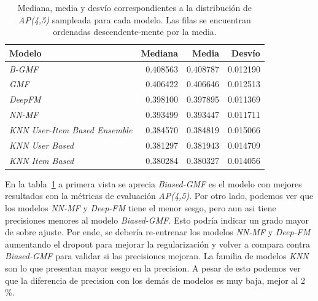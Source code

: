 \documentclass[11pt,a4paper,twoside]{thesis}
\begin{document}
\begin{table}[!htb]
	\centering
	\footnotesize
	\begin{tabular}{lrrr}
		\hline
		Modelo                                & Mediana  & Media    & Desvío   \\
		\hline
		\textit{B-GMF}                        & 0.408563 & 0.408787 & 0.012190 \\
		\textit{GMF}                          & 0.406422 & 0.406646 & 0.012513 \\
		\textit{DeepFM}                       & 0.398100 & 0.397895 & 0.011369 \\
		\textit{NN-MF}                        & 0.393499 & 0.393447 & 0.011711 \\
		\textit{KNN User-Item Based Ensemble} & 0.384570 & 0.384819 & 0.015066 \\
		\textit{KNN User Based}               & 0.381297 & 0.381943 & 0.014709 \\
		\textit{KNN Item Based}               & 0.380284 & 0.380327 & 0.014056 \\
		\hline
	\end{tabular}
	\caption{
		Mediana, media y desvío correspondientes a la distribución de
		\textit{AP(4,5)} sampleada para cada modelo. Las filas se encuentran ordenadas descendente-mente por la media.
	}
	\label{table:ap_at_k}
\end{table}

En la tabla~\ref{table:ap_at_k} a primera vista se aprecia \textit{Biased-GMF}
es el modelo con mejores resultados con la métricas de evaluación
\textit{AP(4,5)}. Por otro lado, podemos ver que los modelos
\textit{NN-MF} y \textit{Deep-FM} tiene el menor sesgo, pero aun asi tiene
precisiones menores al modelo \textit{Biased-GMF}. Esto podría indicar un grado
mayor de sobre ajuste. Por ende, se debería re-entrenar los modelos
\textit{NN-MF} y \textit{Deep-FM} aumentando el dropout para mejorar la
regularización y volver a compara contra \textit{Biased-GMF} para validar si
las precisiones mejoran. La familia de modelos \textit{KNN} son lo que
presentan mayor sesgo en la precision. A pesar de esto podemos ver que la
diferencia de precision con los demás de modelos es muy baja, mejor al 2 \%.
\end{document}

